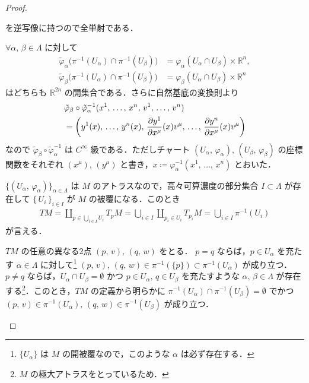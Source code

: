 \documentclass[TQFT_main]{subfiles}
\begin{document}
\begin{proof}
\begin{description}
        を逆写像に持つので全単射である．
        \item[\textbf{(DS-2, 3)}] $\forall \alpha,\, \beta \in \Lambda$ に対して
        \begin{align}
            \tilde{\varphi}_\alpha \bigl( \pi^{-1}(U_\alpha) \cap \pi^{-1}(U_\beta) \bigr) &= \varphi_\alpha (U_\alpha \cap U_\beta) \times \mathbb{R}^n, \\
            \tilde{\varphi}_\beta \bigl( \pi^{-1}(U_\alpha) \cap \pi^{-1}(U_\beta) \bigr) &= \varphi_\beta (U_\alpha \cap U_\beta) \times \mathbb{R}^n
        \end{align}
        はどちらも $\mathbb{R}^{2n}$ の開集合である．さらに自然基底の変換則より
        \begin{align}
            &\tilde{\varphi}_\beta \circ \tilde{\varphi}_\alpha^{-1} (x^1,\, \dots,\, x^n,\, v^1,\, \dots,\, v^n) \\
            &= \left( y^1(x),\, \dots,\, y^n (x),\, \pdv{y^1}{x^\mu}()(x) v^\mu,\, \dots,\, \pdv{y^n}{x^\mu}()(x) v^\mu \right) 
        \end{align}
        なので $\tilde{\varphi}_\beta \circ \tilde{\varphi}_\alpha^{-1} $ は $C^\infty$ 級である．ただしチャート $(U_\alpha,\, \varphi_\alpha),\, (U_\beta,\,\varphi_\beta)$ の座標関数をそれぞれ $(x^\mu),\, (y^\mu)$ と書き，$x \coloneqq\varphi_\alpha^{-1}(x^1,\, \dots,\, x^n)$ とおいた．
        \item[\textbf{(DS-4)}] $\{(U_\alpha,\, \varphi_\alpha)\}_{\alpha \in \Lambda}$ は $M$ のアトラスなので，高々可算濃度の部分集合 $I \subset \Lambda$ が存在して $\{\, U_i\,\}_{i \in I}$ が $M$ の被覆になる．このとき
        \begin{align}
            TM = \coprod_{p \in \bigcup_{i \in I} U_i} T_p M = \bigcup_{i \in I} \coprod_{p_i \in U_i} T_{p_i} M = \bigcup_{i \in I} \pi^{-1} (U_i)
        \end{align}
        が言える．
        \item[\textbf{(DS-5)}] $TM$ の任意の異なる2点 $(p,\, v),\, (q,\, w)$ をとる．
        $p = q$ ならば，$p \in U_\alpha$ を充たす $\alpha \in \Lambda$ に対して\footnote{$\{U_\alpha\}$ は $M$ の開被覆なので，このような $\alpha$ は必ず存在する．} $(p,\, v),\, (q,\,w) \in \pi^{-1} (\{p\}) \subset \pi^{-1}(U_\alpha)$ が成り立つ．
        $p \neq q$ ならば，$U_\alpha \cap U_\beta =\emptyset$ かつ $p \in U_\alpha,\, q \in U_\beta$ を充たすような $\alpha,\, \beta \in \Lambda$ が存在する\footnote{$M$ の極大アトラスをとっているため．}．このとき，$TM$ の定義から明らかに $\pi^{-1} (U_\alpha) \cap \pi^{-1}(U_\beta) = \emptyset$ でかつ $(p,\, v) \in \pi^{-1}(U_\alpha),\, (q,\, w) \in \pi^{-1}(U_\beta)$ が成り立つ．
    \end{description}
    

\end{proof}
\end{document}
